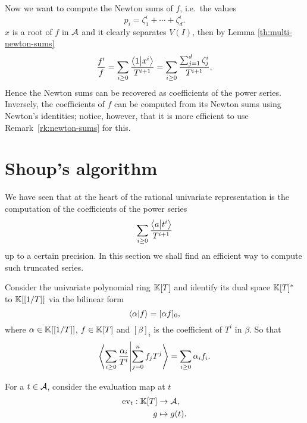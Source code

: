 Now we want to compute the Newton sums of $f$, i.e.\ the values
\begin{equation}
  \label{eq:37}
  p_i = \zeta_1^i + \cdots + \zeta_d^i
  \text{.}
\end{equation}
$x$ is a root of $f$ in $\mathcal{A}$ and it clearly separates $V(I)$,
then by Lemma \ref{th:multi-newton-sums}
\begin{equation}
  \label{eq:45}
  \frac{f'}{f} = \sum_{i\ge0}\frac{\left\langle 1 \middle| x^i \right\rangle}{T^{i+1}} =
  \sum_{i\ge0}\frac{\sum_{j=1}^d\zeta_j^i}{T^{i+1}}
  \text{.}
\end{equation}
  Hence the Newton sums can be recovered
as coefficients of the power series. Inversely, the coefficients of
$f$ can be computed from its Newton sums using Newton's identities;
notice, however, that it is more efficient to use
Remark~\ref{rk:newton-sums} for this.


\section{Shoup's algorithm}
\label{sec:shoups-algorithm}

We have seen that at the heart of the rational univariate
representation is the computation of the coefficients of the power
series
\begin{equation}
  \label{eq:46}
  \sum_{i\ge0}\frac{\left\langle a \middle| t^i \right\rangle}{T^{i+1}}
\end{equation}
up to a certain precision. In this section we shall find an efficient
way to compute such truncated series.

Consider the univariate polynomial ring $\mathbb{K}[T]$ and identify its dual
space $\mathbb{K}[T]^\ast$ to $\mathbb{K}[[1/T]]$ via the bilinear form
\begin{equation}
  \label{eq:47}
  \left\langle \alpha \middle| f \right\rangle = [\alpha f]_0
  \text{,}
\end{equation}
where $\alpha\in\mathbb{K}[[1/T]]$, $f\in\mathbb{K}[T]$ and $[\beta]_i$ is the
coefficient of $T^i$ in $\beta$. So that
\begin{equation}
  \label{eq:48}
  \left\langle \sum_{i\ge0}\frac{\alpha_i}{T^i} \middle| \sum_{j=0}^nf_jT^j \right\rangle =
  \sum_{i\ge0}\alpha_if_i
  \text{.}
\end{equation}

For a $t\in\mathcal{A}$, consider the  evaluation map at $t$
\begin{equation}
  \label{eq:49}
  \begin{aligned}
    \operatorname{ev}_t : \mathbb{K}[T] &\rightarrow \mathcal{A}\text{,}\\
    g &\mapsto g(t)
    \text{.}
  \end{aligned}
\end{equation}

